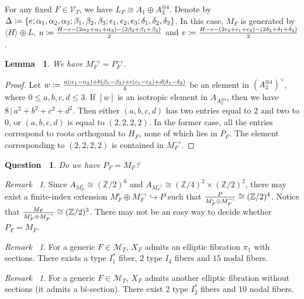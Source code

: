 \documentclass[12pt,reqno,a4paper]{amsart}
\newtheorem{lem}[thm]{Lemma~}
\newtheorem{ques}[thm]{Question~}
\theoremstyle{remark}
\newtheorem{rmk}[thm]{Remark~}
\theoremstyle{definition}
\begin{document}
For any fixed $F\in\mathcal{V}_{T}$, we have $L_F\cong A_1\oplus A_3^{\oplus 4}$.
Denote by $\Delta\coloneqq \{ e;\alpha_1,\alpha_2,\alpha_3;\beta_1,\beta_2,\beta_3;\\ \epsilon_1,\epsilon_2,\epsilon_3;\delta_1,\delta_2,\delta_3 \}$.
In this case, $M_F$ is generated by $\langle H\rangle \oplus L$, $u\coloneqq{H-e-(2\alpha_2+\alpha_1+\alpha_3)-(2\beta_2+\beta_1+\beta_3)\over2}$ and $v\coloneqq{H-e-(2\epsilon_2+\epsilon_1+\epsilon_3)-(2\delta_2+\delta_1+\delta_3)\over2}$. 
\begin{lem}
    We have $M_F^{-\iota}=P_F^{-\iota}$.
\end{lem}
\begin{proof}
    Let $w\coloneqq{a(\alpha_1-\alpha_3)+b(\beta_1-\beta_3)+c(\epsilon_1-\epsilon_3)+d(\delta_1-\delta_3)\over4}$ be an element in $(A_3^{\oplus4})^\vee$, where $0\le a,b,c,d\le 3$.
    If $[w]$ is an isotropic element in $A_{A_3^{\oplus4}}$, then we have $8\,|\,a^2+b^2+c^2+d^2$. 
            Then either $(a,b,c,d)$ has two entries equal to $2$ and two to $0$, or $(a,b,c,d)$ is equal to $(2,2,2,2)$. 
    In the former case, all the entries correspond to roots orthogonal to $H_F$, none of which lies in $P_F$.
    The element corresponding to $(2,2,2,2)$ is contained in $M_F^{-\iota}$. 
\end{proof}
\begin{ques}
    Do we have $P_F=M_F$?
\end{ques}
\begin{rmk}
    Since $A_{M_F^{\iota}}\cong(\mathbb{Z}/2)^6$ and $A_{M_F^{-\iota}}\cong(\mathbb{Z}/4)^2\times(\mathbb{Z}/2)^2$, there may exist a finite-index extension $M_F^{\iota}\oplus M_F^{-\iota}\hookrightarrow P$ such that ${P\over M_F^{\iota}\oplus M_F^{-\iota}}\cong(\mathbb{Z}/2)^4$.
    Notice that ${M_F\over M_F^{\iota}\oplus M_F^{-\iota}}\cong(\mathbb{Z}/2)^3$.
    There may not be an easy way to decide whether $P_F=M_F$.
\end{rmk}


\begin{rmk}
    For a generic $F\in\mathcal{M}_T$, $X_F$ admits an elliptic fibration $\pi_1$ with sections.
    There exists a type $I_1^*$ fiber, $2$ type $I_4$ fibers and $15$ nodal fibers.
    \end{rmk}
\begin{rmk}
    For a generic $F\in\mathcal{M}_T$, $X_F$ admits another elliptic fibration without sections (it admits a bi-section).
    There exist $2$ type $I_2^*$ fibers and $10$ nodal fibers.
\end{rmk}
\end{document}
